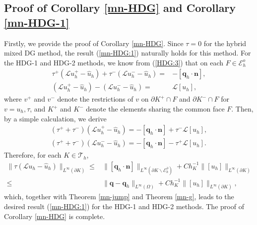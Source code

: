 \documentclass[1996/10/24]{amsart}
\theoremstyle{definition}
\numberwithin{equation}{section}
\begin{document}
\subsection{Proof of Corollary \ref{mn-HDG} and Corollary \ref{mn-HDG-1}}\label{sec3:5}
Firstly, we provide the proof of Corollary \ref{mn-HDG}.
Since $\tau=0$ for the hybrid mixed DG method, the result (\ref{mn-HDG:1}) naturally holds for this method.
For the HDG-1 and HDG-2 methods, we know from (\ref{HDG:3}) that on each $F\in\mathcal{E}_h^o$
\begin{align*}
\tau^+(\mathcal{L}u_h^+-\widehat{u}_h)+\tau^-(\mathcal{L}u_h^--\widehat{u}_h)=&-[{\bm q}_h\cdot{\bm n}],\\
(\mathcal{L}u_h^+-\widehat{u}_h)-(\mathcal{L}u_h^--\widehat{u}_h)=&\mathcal{L}[u_h],
\end{align*}
where $v^+$ and $v^-$ denote the restrictions of $v$ on $\partial K^+\cap F$ and $\partial K^-\cap F$ for $v=u_h,\tau$, and $K^+$ and $K^-$ denote the elements sharing the common face $F$. Then, by a simple calculation, we derive
\begin{align*}
(\tau^++\tau^-)(\mathcal{L}u_h^+-\widehat{u}_h)=-[{\bm q}_h\cdot{\bm n}]+\tau^-\mathcal{L}[u_h],\\
(\tau^++\tau^-)(\mathcal{L}u_h^--\widehat{u}_h)=-[{\bm q}_h\cdot{\bm n}]-\tau^+\mathcal{L}[u_h].
\end{align*}
Therefore, for each $K\in\mathcal{T}_h$,
\begin{align*}
\|\tau(\mathcal{L}u_h-\widehat{u}_h)\|_{L^{\infty}(\partial K)}\leq& \|[{\bm q}_h\cdot{\bm n}]\|_{L^{\infty}(\partial K\backslash\mathcal{E}_h^{\partial})}+Ch_K^{-1}\|[u_h]\|_{L^{\infty}(\partial K)}\\
\leq &\|{\bm q}-{\bm q}_h\|_{L^{\infty}(\Omega)}+Ch_K^{-1}\|[u_h]\|_{L^{\infty}(\partial K)},
\end{align*}
which, together with Theorem \ref{mn-jump} and Theorem \ref{mn-g}, leads to the desired result (\ref{mn-HDG:1}) for the HDG-1 and HDG-2 methods. The proof of Corollary \ref{mn-HDG} is complete.
\end{document}
